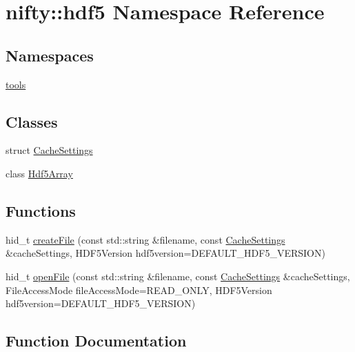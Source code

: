 \hypertarget{namespacenifty_1_1hdf5}{}\section{nifty\+:\+:hdf5 Namespace Reference}
\label{namespacenifty_1_1hdf5}
\subsection*{Namespaces}
\begin{DoxyCompactItemize}
\item 
 \hyperlink{namespacenifty_1_1hdf5_1_1tools}{tools}
\end{DoxyCompactItemize}
\subsection*{Classes}
\begin{DoxyCompactItemize}
\item 
struct \hyperlink{structnifty_1_1hdf5_1_1CacheSettings}{Cache\+Settings}
\item 
class \hyperlink{classnifty_1_1hdf5_1_1Hdf5Array}{Hdf5\+Array}
\end{DoxyCompactItemize}
\subsection*{Functions}
\begin{DoxyCompactItemize}
\item 
hid\+\_\+t \hyperlink{namespacenifty_1_1hdf5_a75c90b819349001bc1cf9e4bbe519462}{create\+File} (const std\+::string \&filename, const \hyperlink{structnifty_1_1hdf5_1_1CacheSettings}{Cache\+Settings} \&cache\+Settings, H\+D\+F5\+Version hdf5version=D\+E\+F\+A\+U\+L\+T\+\_\+\+H\+D\+F5\+\_\+\+V\+E\+R\+S\+I\+O\+N)
\item 
hid\+\_\+t \hyperlink{namespacenifty_1_1hdf5_a1a87959670d984301cfc2c780099673e}{open\+File} (const std\+::string \&filename, const \hyperlink{structnifty_1_1hdf5_1_1CacheSettings}{Cache\+Settings} \&cache\+Settings, File\+Access\+Mode file\+Access\+Mode=R\+E\+A\+D\+\_\+\+O\+N\+L\+Y, H\+D\+F5\+Version hdf5version=D\+E\+F\+A\+U\+L\+T\+\_\+\+H\+D\+F5\+\_\+\+V\+E\+R\+S\+I\+O\+N)
\end{DoxyCompactItemize}


\subsection{Function Documentation}
\hypertarget{namespacenifty_1_1hdf5_a75c90b819349001bc1cf9e4bbe519462}{}
